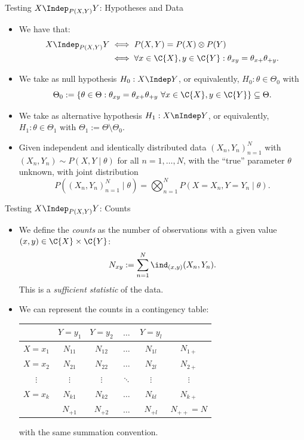 \begin{frame}{Testing $X \Indep_{P(X,Y)} Y$: Hypotheses and Data}
  \begin{itemize}
    \item We have that:
  \begin{equation*}\begin{split}
    X \Indep_{P(X,Y)} Y & \iff P(X,Y) = P(X) \otimes P(Y) \\
                        & \iff \forall x \in \C{X}, y \in \C{Y}: \theta_{xy} = \theta_{x+} \theta_{+ y}.
  \end{split}\end{equation*}
    \item We take as null hypothesis $H_0 : X \Indep Y$, or equivalently, $H_0 : \theta \in \Theta_0$
      with 
      $$\Theta_0 := \{\theta \in \Theta : \theta_{xy} = \theta_{x+} \theta_{+ y} \ \forall x\in\C{X},y\in\C{Y} \} \subseteq \Theta.$$
    \item We take as alternative hypothesis $H_1 : X \nIndep Y$, or equivalently, $H_1 : \theta \in \Theta_1$ with $\Theta_1 := \Theta \setminus \Theta_0$.
    \item Given independent and identically distributed data $(X_n,Y_n)_{n=1}^N$ with
      $(X_n,Y_n) \sim P(X,Y \mid \theta)$ for all $n=1,\dots,N$, with the ``true'' parameter $\theta$ unknown,
      with joint distribution
      $$P((X_n,Y_n)_{n=1}^N \mid \theta) = \bigotimes_{n=1}^N P(X=X_n,Y=Y_n \mid \theta).$$
  \end{itemize}
\end{frame}

\begin{frame}{Testing $X \Indep_{P(X,Y)} Y$: Counts}
  \begin{itemize}
    \item We define the \emph{counts} as the number of observations with a given value $(x,y)\in\C{X}\times\C{Y}$:
$$N_{xy} := \sum_{n=1}^N \ind_{(x,y)}(X_n,Y_n).$$
      This is a \emph{sufficient statistic} of the data.
\item We can represent the counts in a contingency table:
\begin{center}\small\begin{tabular}{c|cccc|c}
  & $Y=y_1$         & $Y=y_2$ & $\dots$ & $Y=y_l$ \\
  \hline
  $X=x_1$ & $N_{11}$      & $N_{12}$      & $\dots$ & $N_{1l}$ & $N_{1+}$\\
  $X=x_2$ & $N_{21}$      & $N_{22}$      & $\dots$ & $N_{2l}$ & $N_{2+}$\\
  $\vdots$ & $\vdots$     & $\vdots$       & $\ddots$ & $\vdots$  & $\vdots$ \\
  $X=x_k$ & $N_{k1}$      & $N_{k2}$      & $\dots$ & $N_{kl}$ & $N_{k+}$ \\
  \hline
  & $N_{+ 1}$ & $N_{+ 2}$ & $\dots$ & $N_{+ l}$ & $N_{++} = N$\\
\end{tabular}\end{center}
with the same summation convention.
  \end{itemize}
\end{frame}

